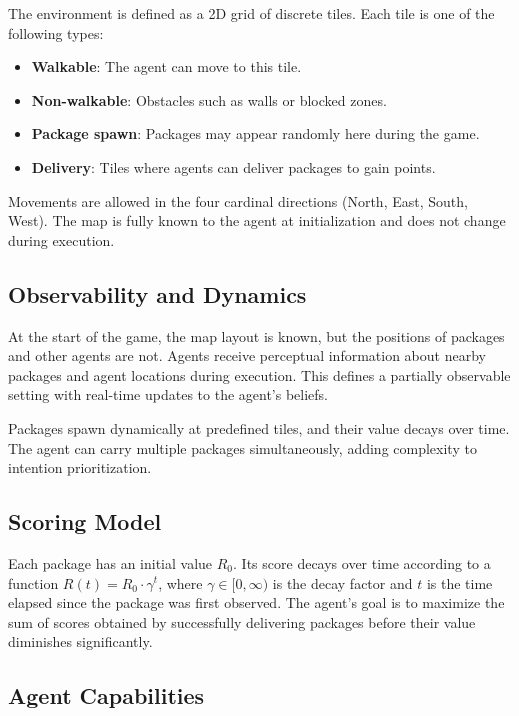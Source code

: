 \documentclass[conference]{IEEEtran}
\begin{document}
The environment is defined as a 2D grid of discrete tiles. Each tile is one of the following types:
\begin{itemize}
	\item \textbf{Walkable}: The agent can move to this tile.
	\item \textbf{Non-walkable}: Obstacles such as walls or blocked zones.
	\item \textbf{Package spawn}: Packages may appear randomly here during the game.
	\item \textbf{Delivery}: Tiles where agents can deliver packages to gain points.
\end{itemize}

Movements are allowed in the four cardinal directions (North, East, South, West). The map is fully known to the agent at initialization and does not change during execution.

\subsection{Observability and Dynamics}

At the start of the game, the map layout is known, but the positions of packages and other agents are not. Agents receive perceptual information about nearby packages and agent locations during execution. This defines a partially observable setting with real-time updates to the agent's beliefs.

Packages spawn dynamically at predefined tiles, and their value decays over time. The agent can carry multiple packages simultaneously, adding complexity to intention prioritization.

\subsection{Scoring Model}

Each package has an initial value \( R_0 \). Its score decays over time according to a function \( R(t) = R_0 \cdot \gamma^t \), where \( \gamma \in  [0, \infty) \) is the decay factor and \( t \) is the time elapsed since the package was first observed. The agent's goal is to maximize the sum of scores obtained by successfully delivering packages before their value diminishes significantly.

\subsection{Agent Capabilities}
\end{document}

